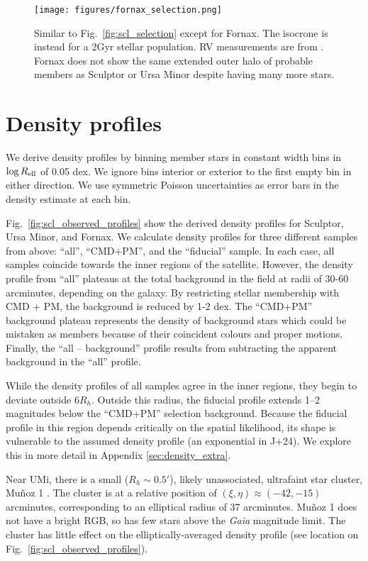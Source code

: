 \begin{figure}
\centering
\texttt{[image: figures/fornax\_selection.png]}
\caption[Fornax sample selection]{Similar to
Fig.~\ref{fig:scl_selection} except for Fornax. The isocrone is instead
for a 2Gyr stellar population. RV measurements are from \citet{WMO2009}.
Fornax does not show the same extended outer halo of probable members as
Sculptor or Ursa Minor despite having many more
stars.}\label{fig:fornax_selection}
\end{figure}

\section{Density profiles}\label{sec:data_density_profiles}

We derive density profiles by binning member stars in constant width
bins in \(\log R_{\rm ell}\) of 0.05 dex. We ignore bins interior or
exterior to the first empty bin in either direction. We use symmetric
Poisson uncertainties as error bars in the density estimate at each bin.

Fig.~\ref{fig:scl_observed_profiles} show the derived density profiles
for Sculptor, Ursa Minor, and Fornax. We calculate density profiles for
three different samples from above: ``all'', ``CMD+PM'', and the
``fiducial'' sample. In each case, all samples coincide towards the
inner regions of the satellite. However, the density profile from
``all'' plateaus at the total background in the field at radii of 30-60
arcminutes, depending on the galaxy. By restricting stellar membership
with CMD + PM, the background is reduced by 1-2 dex. The ``CMD+PM''
background plateau represents the density of background stars which
could be mistaken as members because of their coincident colours and
proper motions. Finally, the ``all -- background'' profile results from
subtracting the apparent background in the ``all'' profile.

While the density profiles of all samples agree in the inner regions,
they begin to deviate outside \(6R_h\). Outside this radius, the
fiducial profile extends 1--2 magnitudes below the ``CMD+PM'' selection
background. Because the fiducial profile in this region depends
critically on the spatial likelihood, its shape is vulnerable to the
assumed density profile (an exponential in J+24). We explore this in
more detail in Appendix \ref{sec:density_extra}.

Near UMi, there is a small (\(R_h\sim 0.5'\)), likely unassociated,
ultrafaint star cluster, Muñoz 1 \citep{munoz+2012}. The cluster is at a
relative position of \((\xi, \eta) \approx(-42, -15)\) arcminutes,
corresponding to an elliptical radius of 37 arcminutes. Muñoz 1 does not
have a bright RGB, so has few stars above the \emph{Gaia} magnitude
limit. The cluster has little effect on the elliptically-averaged
density profile (see location on Fig.~\ref{fig:scl_observed_profiles}).

